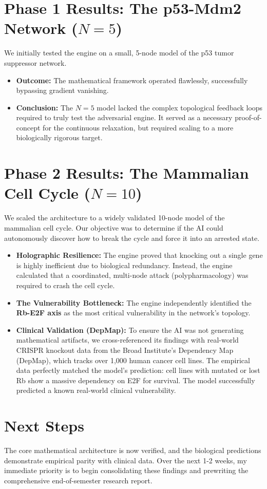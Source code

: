 \documentclass[11pt, letterpaper]{article}
\begin{document}
	\section{Phase 1 Results: The p53-Mdm2 Network ($N=5$)}
	We initially tested the engine on a small, 5-node model of the p53 tumor suppressor network. 
	\begin{itemize}
		\item \textbf{Outcome:} The mathematical framework operated flawlessly, successfully bypassing gradient vanishing.
		\item \textbf{Conclusion:} The $N=5$ model lacked the complex topological feedback loops required to truly test the adversarial engine. It served as a necessary proof-of-concept for the continuous relaxation, but required scaling to a more biologically rigorous target.
	\end{itemize}
	
	\section{Phase 2 Results: The Mammalian Cell Cycle ($N=10$)}
	We scaled the architecture to a widely validated 10-node model of the mammalian cell cycle. Our objective was to determine if the AI could autonomously discover how to break the cycle and force it into an arrested state.
	\begin{itemize}
		\item \textbf{Holographic Resilience:} The engine proved that knocking out a single gene is highly inefficient due to biological redundancy. Instead, the engine calculated that a coordinated, multi-node attack (polypharmacology) was required to crash the cell cycle.
		\item \textbf{The Vulnerability Bottleneck:} The engine independently identified the \textbf{Rb-E2F axis} as the most critical vulnerability in the network's topology. 
		\item \textbf{Clinical Validation (DepMap):} To ensure the AI was not generating mathematical artifacts, we cross-referenced its findings with real-world CRISPR knockout data from the Broad Institute's Dependency Map (DepMap), which tracks over 1,000 human cancer cell lines. The empirical data perfectly matched the model's prediction: cell lines with mutated or lost Rb show a massive dependency on E2F for survival. The model successfully predicted a known real-world clinical vulnerability.
	\end{itemize}
	
	\section{Next Steps}
	The core mathematical architecture is now verified, and the biological predictions demonstrate empirical parity with clinical data. Over the next 1-2 weeks, my immediate priority is to begin consolidating these findings and prewriting the comprehensive end-of-semester research report.
		
	
\end{document}
